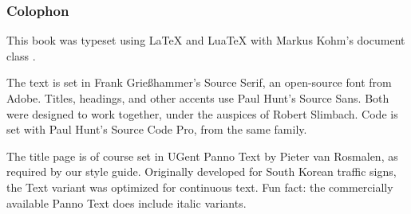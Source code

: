 \documentclass[main]{subfiles}
\begin{document}
\vspace*{\fill}

\begin{small}
    \subsubsection*{Colophon}

    This book was typeset using {\LaTeX} and {Lua\TeX} with Markus Kohm's document class {\KOMAScript}.

    The text is set in Frank Grießhammer's Source Serif, an open-source font from Adobe.
    Titles, headings, and other accents use Paul Hunt's {\sffamily Source Sans}.
    Both were designed to work together, under the auspices of Robert Slimbach.
    Code is set with Paul Hunt's {\ttfamily Source Code Pro}, from the same family.

    The title page is of course set in {\panno\selectfont UGent Panno Text} by Pieter van Rosmalen, as required by our style guide.
    Originally developed for South Korean traffic signs, the Text variant was optimized for continuous text.
    Fun fact: the commercially available Panno Text does include italic variants.
\end{small}
\end{document}
